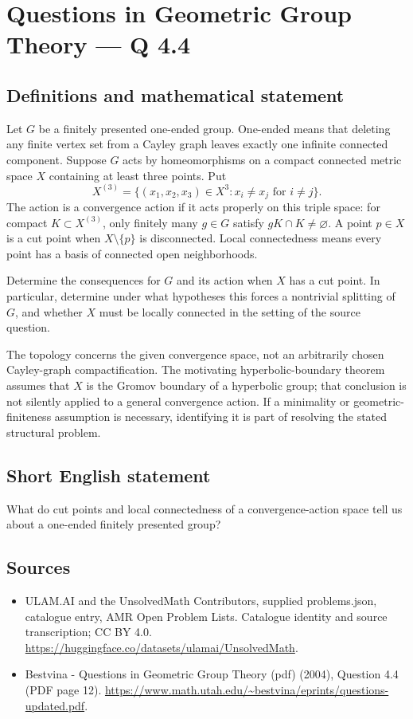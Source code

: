 \documentclass[11pt,a4paper]{article}
\begin{document}
\section*{Questions in Geometric Group Theory — Q 4.4}\label{statement}

\subsection{Definitions and mathematical statement}
Let $G$ be a finitely presented one-ended group. One-ended means that deleting any finite vertex set from a Cayley graph leaves exactly one infinite connected component. Suppose $G$ acts by homeomorphisms on a compact connected metric space $X$ containing at least three points. Put
\[
 X^{(3)}=\{(x_1,x_2,x_3)\in X^3:x_i\ne x_j\text{ for }i\ne j\}.
\]
The action is a convergence action if it acts properly on this triple space: for compact $K\subset X^{(3)}$, only finitely many $g\in G$ satisfy $gK\cap K\ne\varnothing$. A point $p\in X$ is a cut point when $X\setminus\{p\}$ is disconnected. Local connectedness means every point has a basis of connected open neighborhoods.

Determine the consequences for $G$ and its action when $X$ has a cut point. In particular, determine under what hypotheses this forces a nontrivial splitting of $G$, and whether $X$ must be locally connected in the setting of the source question.

The topology concerns the given convergence space, not an arbitrarily chosen Cayley-graph compactification. The motivating hyperbolic-boundary theorem assumes that $X$ is the Gromov boundary of a hyperbolic group; that conclusion is not silently applied to a general convergence action. If a minimality or geometric-finiteness assumption is necessary, identifying it is part of resolving the stated structural problem.
\subsection{Short English statement}
What do cut points and local connectedness of a convergence-action space tell us about a one-ended finitely presented group?
\subsection{Sources}
\begin{itemize}
\item[S1] ULAM.AI and the UnsolvedMath Contributors, supplied problems.json, catalogue entry, AMR Open Problem Lists. Catalogue identity and source transcription; CC BY 4.0.
\url{https://huggingface.co/datasets/ulamai/UnsolvedMath}.
\item[S2] Bestvina - Questions in Geometric Group Theory (pdf) (2004), Question 4.4 (PDF page 12). 
\url{https://www.math.utah.edu/~bestvina/eprints/questions-updated.pdf}.
\end{itemize}
\end{document}
